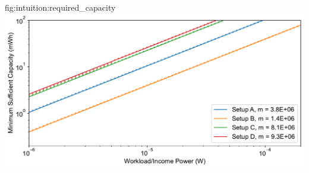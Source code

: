 \begin{definefigure}{fig:intuition:required_capacity}
    \centering
    \includegraphics[width=\columnwidth]{figs/chap3/required_capacity.pdf}
    \caption{
    The minimum sufficient capacity to support a workload given an income. Note the x- and y-axis log scale. The average workload and income power are set equal; however the variability of income power is determined by the synthetic EnHANTs traces. The minimum sufficient capacity follows a linear trend with increasing income and workload power. Even though each line appears parallel, lines that are higher up on the y-axis are actually steeper due to the log scale. 
    }
\end{definefigure}